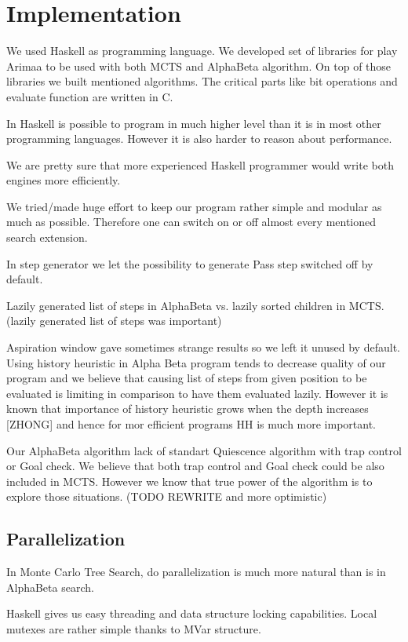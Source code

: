 \chapter{Implementation}
We used Haskell as programming language. We developed set of libraries for play
Arimaa to be used with both MCTS and AlphaBeta algorithm. On top of those
libraries we built mentioned algorithms. The critical parts like bit operations
and evaluate function are written in C.

In Haskell is possible to program in much higher level than it is in most other
programming languages. However it is also harder to reason about performance.

We are pretty sure that more experienced Haskell programmer would write both
engines more efficiently.


We tried/made huge effort to keep our program rather simple and modular as much
as possible. Therefore one can switch on or off almost every mentioned search
extension.

In step generator we let the possibility to generate Pass step switched off by
default.

Lazily generated list of steps in AlphaBeta vs. lazily sorted children in MCTS.
(lazily generated list of steps was important)

Aspiration window gave sometimes strange results so we left it unused by default.
Using history heuristic in Alpha Beta program tends to decrease quality of our
program and we believe that causing list of steps from given position to be
evaluated is limiting in comparison to have them evaluated lazily. However it
is known that importance of history heuristic grows when the depth increases
[ZHONG] and hence for mor efficient programs HH is much more important.

Our AlphaBeta algorithm lack of standart Quiescence algorithm with trap control
or Goal check. We believe that both trap control and Goal check could be also
included in MCTS. However we know that true power of the algorithm is to
explore those situations. (TODO REWRITE and more optimistic)

\section{Parallelization}
In Monte Carlo Tree Search, do parallelization is much more natural than is in
AlphaBeta search.

Haskell gives us easy threading and data structure locking capabilities.
Local mutexes are rather simple thanks to MVar structure.

